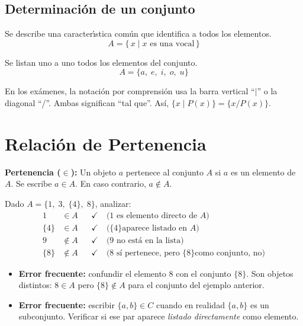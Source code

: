 \subsection{Determinaci\'on de un conjunto}

\begin{cajaprop}
  Se describe una caracter\'{\i}stica com\'un que identifica a todos los elementos.
  \[
    A = \{\,x \mid x \text{ es una vocal}\,\}
  \]
\end{cajaprop}

\begin{cajaprop}
  Se listan uno a uno todos los elementos del conjunto.
  \[
    A = \{a,\; e,\; i,\; o,\; u\}
  \]
\end{cajaprop}

\begin{cajatip}
  En los exámenes, la notación por comprensión usa la barra vertical ``$\mid$''
  o la diagonal ``/''. Ambas significan ``tal que''. Así,
  $\{x \mid P(x)\} = \{x / P(x)\}$.
\end{cajatip}

\section{Relaci\'on de Pertenencia}

\begin{cajadef}
  \textbf{Pertenencia ($\in$):} Un objeto $a$ pertenece al conjunto $A$ si $a$
  es un elemento de $A$. Se escribe $a \in A$. En caso contrario, $a \notin A$.
\end{cajadef}

\begin{cajaejemplo}[1]
  Dado $A = \{1,\; 3,\; \{4\},\; 8\}$, analizar:
  \begin{align*}
    1 &\in A && \checkmark \quad \text{(1 es elemento directo de } A\text{)} \\
    \{4\} &\in A && \checkmark \quad \text{(\{4\} aparece listado en } A\text{)} \\
    9 &\notin A && \checkmark \quad \text{(9 no está en la lista)} \\
    \{8\} &\notin A && \checkmark \quad \text{(8 sí pertenece, pero \{8\} como conjunto, no)}
  \end{align*}
\end{cajaejemplo}

\begin{cajaadvert}
  \begin{itemize}
    \item \textbf{Error frecuente:} confundir el elemento $8$ con el conjunto
      $\{8\}$. Son objetos distintos: $8 \in A$ pero $\{8\} \notin A$ para el
      conjunto del ejemplo anterior.
    \item \textbf{Error frecuente:} escribir $\{a, b\} \in C$ cuando en realidad
      $\{a, b\}$ es un subconjunto. Verificar si ese par aparece \emph{listado
      directamente} como elemento.
  \end{itemize}
\end{cajaadvert}

